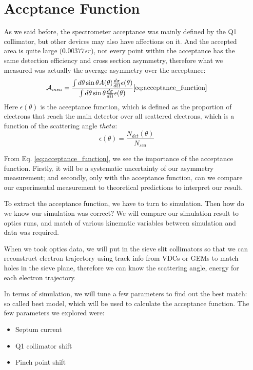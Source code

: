 \section{Accptance Function}
As we said before, the spectrometer acceptance was mainly defined by the Q1 
collimator, but other devices may also have affections on it. And the accepted
area is quite large ($0.00377 sr$), not every point within the acceptance has 
the same detection efficiency and cross section asymmetry, therefore what
we measured was actually the average asymmetry over the acceptance:
\begin{equation}
    \mathcal{A}_{mea} = \frac{\int d\theta \sin\theta A(\theta) \frac{d\sigma}{d\Omega} \epsilon(\theta)}{\int d\theta \sin\theta \frac{d\sigma}{d\Omega} \epsilon(\theta)}
    \ref{eq:acceptance_function}
\end{equation}
Here $\epsilon(\theta)$ is the aceeptance function, which is defined as
the proportion of electrons that reach the main detector over all scattered
electrons, which is a function of the scattering angle $theta$:
$$ \epsilon(\theta) = \frac{N_{det}(\theta)}{N_{sca}} $$

From Eq. \ref{eq:acceptance_function}, we see the importance of the acceptance
function. Firstly, it will be a systematic uncertainty of our asymmetry
measurement; and secondly, only with the acceptance function, can we compare
our experimental measurement to theoretical predictions to interpret our
result.

To extract the acceptance function, we have to turn to simulation. Then how
do we know our simulation was correct? We will compare our simulation result
to optics runs, and match of various kinematic variables between simulation
and data was required. 

When we took optics data, we will put in the sieve slit collimators so that 
we can reconstruct electron trajectory using track info from VDCs or GEMs 
to match holes in the sieve plane, therefore we can know the scattering angle, 
energy for each electron trajectory.

In terms of simulation, we will tune a few parameters to find out the best
match: so called best model, which will be used to calculate the acceptance
function. The few parameters we explored were:
\begin{itemize}
    \item Septum current
    \item Q1 collimator shift
    \item Pinch point shift
\end{itemize}

